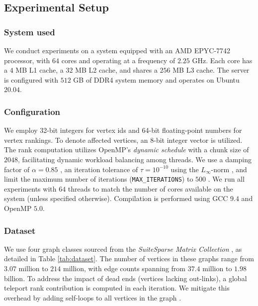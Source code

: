 \subsection{Experimental Setup}
\label{sec:setup}

\subsubsection{System used}

We conduct experiments on a system equipped with an AMD EPYC-7742 processor, with $64$ cores and operating at a frequency of $2.25$ GHz. Each core has a $4$ MB L1 cache, a $32$ MB L2 cache, and shares a $256$ MB L3 cache. The server is configured with $512$ GB of DDR4 system memory and operates on Ubuntu $20.04$.


\subsubsection{Configuration}

We employ 32-bit integers for vertex ids and 64-bit floating-point numbers for vertex rankings. To denote affected vertices, an 8-bit integer vector is utilized. The rank computation utilizes OpenMP's \textit{dynamic schedule} with a chunk size of $2048$, facilitating dynamic workload balancing among threads. We use a damping factor of $\alpha = 0.85$ \cite{rank-langville06}, an iteration tolerance of $\tau = 10^{-10}$ using the $L_\infty$-norm \cite{rank-dubey22, rank-plimpton11}, and limit the maximum number of iterations (\texttt{MAX\_ITERATIONS}) to $500$ \cite{nvgraph}. We run all experiments with $64$ threads to match the number of cores available on the system (unless specified otherwise). Compilation is performed using GCC $9.4$ and OpenMP $5.0$.


\subsubsection{Dataset}

We use four graph classes sourced from the \textit{SuiteSparse Matrix Collection} \cite{suite19}, as detailed in Table \ref{tab:dataset}. The number of vertices in these graphs range from $3.07$ million to $214$ million, with edge counts spanning from $37.4$ million to $1.98$ billion. To address the impact of dead ends (vertices lacking out-links), a global teleport rank contribution is computed in each iteration. We mitigate this overhead by adding self-loops to all vertices in the graph \cite{rank-andersen07, rank-langville06}.

